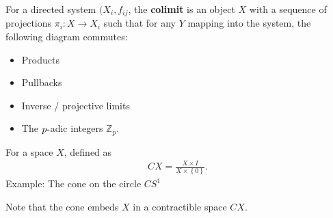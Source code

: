 \begin{definition}[Colimit]

For a directed system \((X_{i}, f_{ij}\), the \textbf{colimit} is an
object \(X\) with a sequence of projections \(\pi_{i}:X\to X_{i}\) such
that for any \(Y\) mapping into the system, the following diagram
commutes:

\begin{center}
\end{center}

\end{definition}

\begin{example}[of colimits]

\envlist

\begin{itemize}
\tightlist
\item
  Products
\item
  Pullbacks
\item
  Inverse / projective limits
\item
  The \(p{\hbox{-}}\)adic integers \({\mathbb{Z}}_{p}\).
\end{itemize}

\end{example}

\begin{definition}[Cone]

For a space \(X\), defined as
\begin{align*}  
CX = \frac{X\times I} {X \times\left\{{0}\right\}}
.\end{align*}
Example: The cone on the circle \(CS^1\)

Note that the cone embeds \(X\) in a contractible space \(CX\).

\end{definition}

